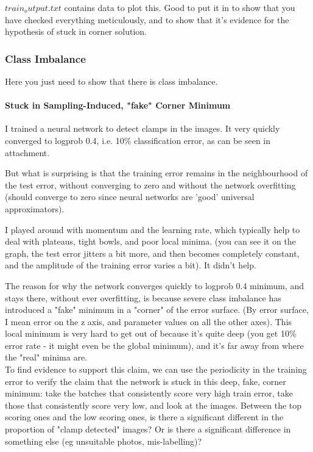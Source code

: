 \documentclass[a4paper,11pt]{article}
\begin{document}
$train_output.txt$ contains data to plot this. Good to put it in to show that you have checked everything meticulously, and to show that it's evidence for the hypothesis of stuck in corner solution.



\subsubsection{Class Imbalance}

Here you just need to show that there is class imbalance.

\paragraph{Stuck in Sampling-Induced, "fake" Corner Minimum}

I trained a neural network to detect clamps in the images. It very quickly converged to logprob 0.4, i.e. 10\% classification error, as can be seen in attachment.

But what is surprising is that the training error remains in the neighbourhood of the test error, without converging to zero and without the network overfitting (should converge to zero since neural networks are 'good' universal approximators).

I played around with momentum and the learning rate, which typically help to deal with plateaus, tight bowls, and poor local minima. (you can see it on the graph, the test error jitters a bit more, and then becomes completely constant, and the amplitude of the training error varies a bit). It didn't help.

The reason for why the network converges quickly to logprob 0.4 minimum, and stays there, without ever overfitting, is because severe class imbalance has introduced a "fake" minimum in a "corner" of the error surface. (By error surface, I mean error on the z axis, and parameter values on all the other axes). This local minimum is very hard to get out of because it's quite deep (you get 10\% error rate - it might even be the global minimum), and it's far away from where the "real" minima are. \\

To find evidence to support this claim, we can use the periodicity in the training error to verify the claim that the network is stuck in this deep, fake, corner minimum: take the batches that consistently score very high train error, take those that consistently score very low, and look at the images. Between the top scoring ones and the low scoring ones, is there a significant different in the proportion of "clamp detected" images? Or is there a significant difference in something else (eg unsuitable photos, mis-labelling)?
\end{document}
